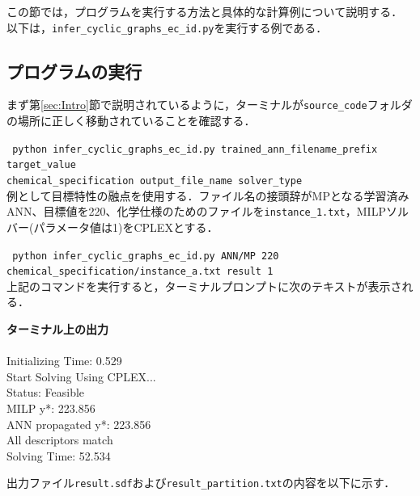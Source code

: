\documentclass[11pt, titlepage, dvipdfmx, twoside]{jarticle}
\newcommand{\target}{目標}
\begin{document}
この節では，プログラムを実行する方法と具体的な計算例について説明する．
以下は，{\tt infer\_cyclic\_graphs\_ec\_id.py}を実行する例である．

\subsection{プログラムの実行}
\label{sec:Exp_1}

まず第\ref{sec:Intro}節で説明されているように，ターミナルが{\tt source\_code}フォルダの場所に正しく移動されていることを確認する．



\noindent
{\tt 
 python  infer\_cyclic\_graphs\_ec\_id.py 
trained\_ann\_filename\_prefix
target\_value \\
 \phantom{python }
 chemical\_specification
output\_file\_name
solver\_type
 }\\

例として\target 特性の融点を使用する．ファイル名の接頭辞がMPとなる学習済みANN、\target 値を220、化学仕様のためのファイルを{\tt instance\_1.txt}，MILPソルバー(パラメータ値は1)をCPLEX\cite{cplex}とする．

{\tt 
 python infer\_cyclic\_graphs\_ec\_id.py 
ANN/MP
220 \\
 \phantom{python }
chemical\_specification/instance\_a.txt
result
1
 }\\


上記のコマンドを実行すると，ターミナルプロンプトに次のテキストが表示される．

\bigskip

\begin{oframed}
{\bf ターミナル上の出力}\\\\
 Initializing Time: 0.529  \\
Start Solving Using CPLEX...\\
Status: Feasible 		\\
MILP y*: 223.856 		\\
ANN propagated y*: 223.856 \\
All descriptors match    	\\
Solving Time: 52.534       
\end{oframed}

出力ファイル{\tt result.sdf}および{\tt result\_partition.txt}の内容を以下に示す．

\bigskip
\end{document}
